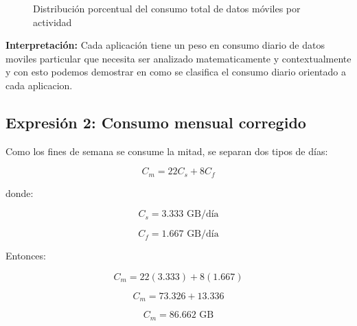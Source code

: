 \documentclass[12pt,a4paper]{article}
\begin{document}
\begin{figure}[H]
{
		}
		
		\caption{Distribución porcentual del consumo total de datos móviles por actividad}
		\label{fig:pastel_consumo}
		
	\end{figure}
	\textbf{Interpretación:} Cada aplicación tiene un peso en consumo diario de datos moviles particular que necesita ser analizado matematicamente y contextualmente y con esto podemos demostrar en como se clasifica el consumo diario orientado a cada aplicacion.
	
	\subsection{Expresión 2: Consumo mensual corregido}
	
	Como los fines de semana se consume la mitad, se separan dos tipos de días:
	
	\[
	C_m=22C_s+8C_f
	\]
	
	donde:
	
	\[
	C_s=3.333\text{ GB/día}
	\]
	
	\[
	C_f=1.667\text{ GB/día}
	\]
	
	Entonces:
	
	\[
	C_m=22(3.333)+8(1.667)
	\]
	
	\[
	C_m=73.326+13.336
	\]
	
	\[
	C_m=86.662\text{ GB}
	\]
	
\end{document}
